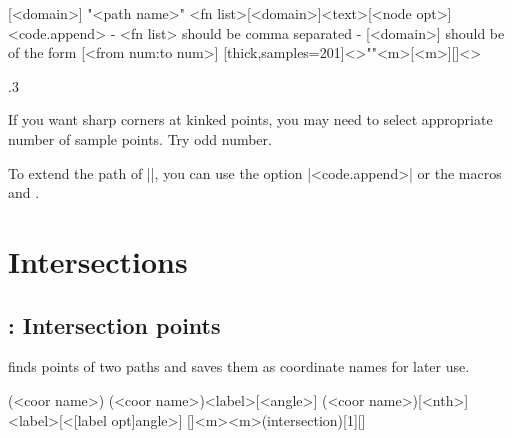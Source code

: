\begin{tzdef}{}
[<domain>]
"<path name>"
     {<fn list>}[<domain>]{<text>}[<node opt>]<code.append>
  - {<fn list>} should be comma separated
  - [<domain>] should be of the form [<from num:to num>]
  [thick,samples=201]<>""{<m>}[<m>]{}[]<>
\end{tzdef}


\begin{tzcode}{.3}
\end{tzcode}

\remark If you want sharp corners at kinked points, you may need to select appropriate number of sample points. Try odd number.

To extend the path of |\tzfnmin|, you can use the option |<code.append>| or the macros \icmd{\tzfnminAtBegin} and \icmd{\tzfnminAtEnd}.






\chapter{Intersections}
\label{c:intersections}

\section{\protect\cmd{\tzXpoint(*)}: Intersection points}
\label{s:intersections}

\icmd{\tzXpoint} finds  points of two paths and saves them as coordinate names for later use.

\begin{tzdef}{}
(<coor name>)
(<coor name>){<label>}[<angle>]
(<coor name>)[<nth>]{<label>}[<[label opt]angle>]
  []{<m>}{<m>}(intersection)[1]{}[]
\end{tzdef}

